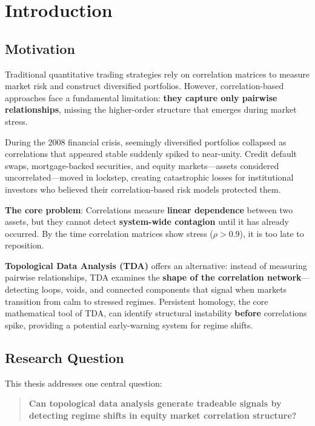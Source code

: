 \section{Introduction}
\label{sec:introduction}

\subsection{Motivation}

Traditional quantitative trading strategies rely on correlation matrices to measure market risk and construct diversified portfolios. However, correlation-based approaches face a fundamental limitation: \textbf{they capture only pairwise relationships}, missing the higher-order structure that emerges during market stress.

During the 2008 financial crisis, seemingly diversified portfolios collapsed as correlations that appeared stable suddenly spiked to near-unity. Credit default swaps, mortgage-backed securities, and equity markets---assets considered uncorrelated---moved in lockstep, creating catastrophic losses for institutional investors who believed their correlation-based risk models protected them.

\textbf{The core problem}: Correlations measure \textbf{linear dependence} between two assets, but they cannot detect \textbf{system-wide contagion} until it has already occurred. By the time correlation matrices show stress ($\rho > 0.9$), it is too late to reposition.

\textbf{Topological Data Analysis (TDA)} offers an alternative: instead of measuring pairwise relationships, TDA examines the \textbf{shape of the correlation network}---detecting loops, voids, and connected components that signal when markets transition from calm to stressed regimes. Persistent homology, the core mathematical tool of TDA, can identify structural instability \textbf{before} correlations spike, providing a potential early-warning system for regime shifts.

\subsection{Research Question}

This thesis addresses one central question:

\begin{quote}
\textbf{Can topological data analysis generate tradeable signals by detecting regime shifts in equity market correlation structure?}
\end{quote}

